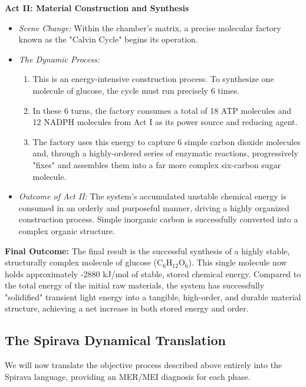 \documentclass[11pt, a4paper]{article}
\begin{document}
\textbf{Act II: Material Construction and Synthesis}
\begin{itemize}
    \item \textit{Scene Change:} Within the chamber's matrix, a precise molecular factory known as the "Calvin Cycle" begins its operation.
    \item \textit{The Dynamic Process:}
    \begin{enumerate}
        \item This is an energy-intensive construction process. To synthesize one molecule of glucose, the cycle must run precisely 6 times.
        \item In these 6 turns, the factory consumes a total of 18 ATP molecules and 12 NADPH molecules from Act I as its power source and reducing agent.
        \item The factory uses this energy to capture 6 simple carbon dioxide molecules and, through a highly-ordered series of enzymatic reactions, progressively "fixes" and assembles them into a far more complex six-carbon sugar molecule.
    \end{enumerate}
    \item \textit{Outcome of Act II:} The system's accumulated unstable chemical energy is consumed in an orderly and purposeful manner, driving a highly organized construction process. Simple inorganic carbon is successfully converted into a complex organic structure.
\end{itemize}
\textbf{Final Outcome:} The final result is the successful synthesis of a highly stable, structurally complex molecule of glucose (C$_6$H$_{12}$O$_6$). This single molecule now holds approximately -2880 kJ/mol of stable, stored chemical energy. Compared to the total energy of the initial raw materials, the system has successfully "solidified" transient light energy into a tangible, high-order, and durable material structure, achieving a net increase in both stored energy and order.

\subsection{The Spirava Dynamical Translation}
We will now translate the objective process described above entirely into the Spirava language, providing an MER/MEI diagnosis for each phase.
\end{document}
